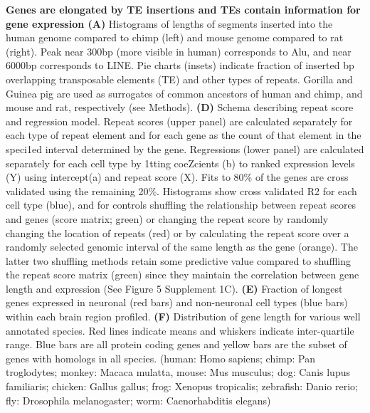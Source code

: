\textbf{Genes are elongated by TE insertions and TEs contain information for gene expression (A)} Histograms of lengths of segments inserted into the human genome compared to chimp (left) and mouse genome compared to rat (right). Peak near 300bp (more visible in human) corresponds to Alu, and near 6000bp corresponds to LINE. Pie charts (insets) indicate fraction of inserted bp overlapping transposable elements (TE) and other types of repeats. Gorilla and Guinea pig are used as surrogates of common ancestors of human and chimp, and mouse and rat, respectively (see Methods). %
\textbf{(D)} Schema describing repeat score and regression model. Repeat scores (upper panel) are calculated separately for each type of repeat element and for each gene as the count of that element in the speci1ed interval determined by the gene. Regressions (lower panel) are calculated separately for each cell type by 1tting coeZcients (b) to ranked expression levels (Y) using intercept(a) and repeat score (X). Fits to 80\% of the genes are cross validated using the remaining 20\%. Histograms show cross validated R2 for each cell type (blue), and for controls shuffling the relationship between repeat scores and genes (score matrix; green) or changing the repeat score by randomly changing the location of repeats (red) or by calculating the repeat score over a randomly selected genomic interval of the same length as the gene (orange). The latter two shuffling methods retain some predictive value compared to shuffling the repeat score matrix (green) since they maintain the correlation between gene length and expression (See Figure 5 Supplement 1C). \textbf{(E)} Fraction of longest genes expressed in neuronal (red bars) and non-neuronal cell types (blue bars) within each brain region profiled. \textbf{(F)} Distribution of gene length for various well annotated species. Red lines indicate means and whiskers indicate inter-quartile range. Blue bars are all protein coding genes and yellow bars are the subset of genes with homologs in all species. (human: Homo sapiens; chimp: Pan troglodytes; monkey: Macaca mulatta, mouse: Mus musculus; dog: Canis lupus familiaris; chicken: Gallus gallus; frog: Xenopus tropicalis; zebrafish: Danio rerio; fly: Drosophila melanogaster; worm: Caenorhabditis elegans) 